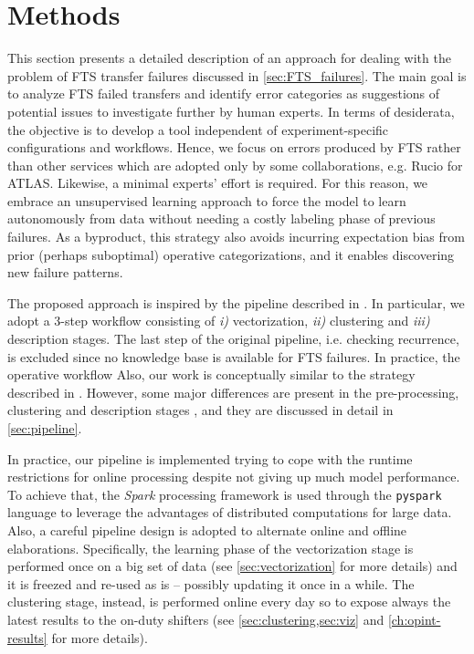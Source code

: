 \chapter{Methods}

This section presents a detailed description of an approach for dealing with the problem of FTS transfer failures discussed in \cref{sec:FTS_failures}.
The main goal is to analyze FTS failed transfers and identify error categories as suggestions of potential issues to investigate further by human experts.
In terms of desiderata, the objective is to develop a tool independent of experiment-specific configurations and workflows. Hence, we focus on errors produced by FTS rather than other services which are adopted only by some collaborations, e.g. Rucio for ATLAS.
Likewise, a minimal experts' effort is required. For this reason, we embrace an unsupervised learning approach to force the model to learn autonomously from data without needing a costly labeling phase of previous failures.
As a byproduct, this strategy also avoids incurring expectation bias from prior (perhaps suboptimal) operative categorizations, and it enables discovering new failure patterns.

The proposed approach \cite[Section 2.19]{opint2022} is inspired by the pipeline described in . %
In particular, we adopt a 3-step workflow consisting of \textit{i)} vectorization, \textit{ii)} clustering and \textit{iii)} description stages. 
The last step of the original pipeline, i.e. checking recurrence, is excluded since no knowledge base is available for FTS failures.
In practice, the operative workflow
Also, our work is conceptually similar to the strategy described in . However, some major differences are present in the pre-processing, clustering and description stages%
, and they are discussed in detail in \cref{sec:pipeline}.

In practice, our pipeline is implemented trying to cope with the runtime restrictions for online processing despite not giving up much model performance.
To achieve that, the \textit{Spark} processing framework is used through the \texttt{pyspark} language to leverage the advantages of distributed computations for large data.
Also, a careful pipeline design is adopted to alternate online and offline elaborations.
Specifically, the learning phase of the vectorization stage is performed once on a big set of data (see \cref{sec:vectorization} for more details) and it is freezed and re-used as is -- possibly updating it once in a while.
The clustering stage, instead, is performed online every day so to expose always the latest results to the on-duty shifters (see %
\cref{sec:clustering,sec:viz} and \cref{ch:opint-results} 
for more details).
